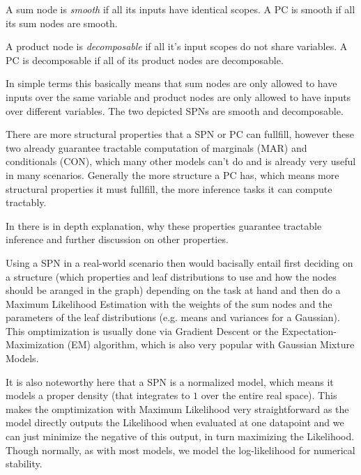\begin{definition}[Smoothness]
    A sum node is \textit{smooth} if all its inputs have identical scopes. A PC is smooth if all its sum nodes are smooth. \cite{pc_intro}
\end{definition}
\begin{definition}[Decomposability]
    A product node is \textit{decomposable} if all it's input scopes do not share variables. A PC is decomposable if all of its product nodes are decomposable. \cite{pc_intro}
\end{definition}

In simple terms this basically means that sum nodes are only allowed to have inputs over the same variable and product nodes are
only allowed to have inputs over different variables. The two depicted SPNs are smooth and decomposable.

There are more structural properties that a SPN or PC can fullfill, however these two already guarantee tractable computation of 
marginals (MAR) and conditionals (CON)\cite{pc_intro}, which many other models can't do and is already very useful in many scenarios. 
Generally the more structure a PC has, which means more structural properties it must fullfill, the more inference tasks it can compute 
tractably. 

In \cite{pc_intro} there is in depth explanation, why these properties guarantee tractable inference 
and further discussion on other properties.

Using a SPN in a real-world scenario then would bacisally entail first deciding on a structure (which properties and leaf 
distributions to use and how the nodes should be aranged in the graph) depending on the task at hand and then do a Maximum Likelihood 
Estimation with the weights of the sum nodes and the parameters of the leaf distributions (e.g. means and variances for a Gaussian). 
This omptimization is usually done via Gradient Descent or the Expectation-Maximization (EM) algorithm, 
which is also very popular with Gaussian Mixture Models. 

It is also noteworthy here that a SPN is a normalized model, which means it models a proper density (that integrates to $1$ over the entire real space). 
This makes the omptimization with Maximum Likelihood very straightforward as the model directly outputs the Likelihood when evaluated at one datapoint and 
we can just minimize the negative of this output, in turn maximizing the Likelihood.
Though normally, as with most models, we model the log-likelihood for numerical stability.


